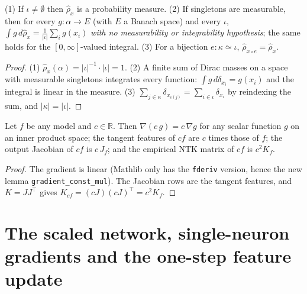 \begin{lemma}\label{lem:ntkfl:empirical}
  \leanok
(1) If $\iota\ne\emptyset$ then $\hat\rho_x$ is a probability measure.
(2) If singletons are measurable, then for every $g:\alpha\to E$ (with $E$ a Banach space) and every $\iota$,
$\int g\,d\hat\rho_x=\frac1{|\iota|}\sum_ig(x_i)$ \emph{with no measurability or integrability hypothesis}; the
same holds for the $[0,\infty]$-valued integral.
(3) For a bijection $e:\kappa\simeq\iota$, $\hat\rho_{x\circ e}=\hat\rho_x$.
\end{lemma}

\begin{proof}
  \leanok
(1) $\hat\rho_x(\alpha)=|\iota|^{-1}\cdot|\iota|=1$. (2) A finite sum of Dirac masses on a space with measurable singletons
integrates every function: $\int g\,d\delta_{x_i}=g(x_i)$ and the integral is linear in the measure. (3) $\sum_{j\in\kappa}\delta_{x_{e(j)}}=\sum_{i\in\iota}\delta_{x_i}$
by reindexing the sum, and $|\kappa|=|\iota|$.
\end{proof}

\begin{lemma}\label{lem:ntkfl:constMul}
  \leanok
Let $f$ be any model and $c\in\mathbb R$. Then $\nabla(c\,g)=c\,\nabla g$ for any scalar function $g$ on an inner product space; the tangent features of $cf$
are $c$ times those of $f$; the output Jacobian of $cf$ is $c\,J_f$; and the empirical NTK matrix of $cf$ is
$c^2K_f$.
\end{lemma}

\begin{proof}
  \leanok
The gradient is linear (Mathlib only has the \texttt{fderiv} version, hence the new lemma \texttt{gradient\_const\_mul}).
The Jacobian rows are the tangent features, and $K=JJ^\top$ gives $K_{cf}=(cJ)(cJ)^\top=c^2K_f$.
\end{proof}


\section{The scaled network, single-neuron gradients and the one-step feature update}\label{sec:ntkfl:basic}

